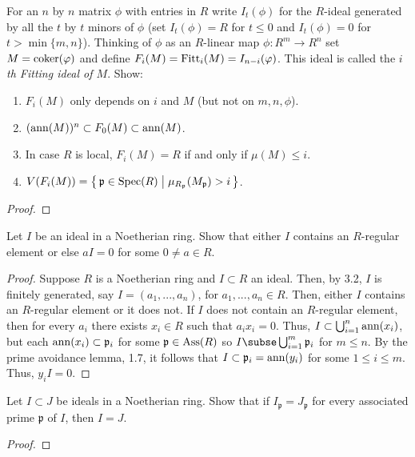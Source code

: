 \begin{problem}
For an $n$ by $n$ matrix $\phi$ with entries in $R$ write
$I_t(\phi)$ for the $R$-ideal generated by all the $t$ by $t$
minors of $\phi$ (set $I_t(\phi)=R$ for $t\leq 0$ and
$I_t(\phi)=0$ for $t>\min\{m,n\}$). Thinking of $\phi$ as an
$R$-linear map $\phi\colon R^m\to R^n$ set $M=\operatorname{coker}(\varphi)$ and
define $F_i(M)=\operatorname{Fitt}_i(M)=I_{n-i}(\varphi)$. This ideal is called
the \emph{$i$th Fitting ideal of $M$}. Show:
\begin{enumerate}[label=(\alph*)]
\item $F_i(M)$ only depends on $i$ and $M$ (but not on
  $m,n,\phi$).
\item $(\operatorname{ann}(M))^n\subset F_0(M)\subset\operatorname{ann}(M)$.
\item In case $R$ is local, $F_i(M)=R$ if and only if $\mu(M)\leq
  i$.
\item
  $V(F_i(M))=
\left\{\,\mathfrak{p}\in\operatorname{Spec}(R)\;\middle|\;\mu_{R_{\mathfrak{p}}}(M_{\mathfrak{p}})>i\,\right\}$.
\end{enumerate}
\end{problem}
\begin{proof}
\end{proof}
\newpage
\begin{problem}
Let $I$ be an ideal in a Noetherian ring. Show that either $I$
contains an $R$-regular element or else $aI=0$ for some $0\neq
a\in R$.
\end{problem}
\begin{proof}
Suppose $R$ is a Noetherian ring and $I\subset R$ an ideal. Then, by
3.2, $I$ is finitely generated, say $I=(a_1,...,a_n)$, for
$a_1,...,a_n\in R$. Then, either $I$ contains an $R$-regular element
or it does not. If $I$ does not contain an $R$-regular element, then
for every $a_i$ there exists $x_i\in R$ such that $a_ix_i=0$. Thus,
$I\subset\bigcup_{i=1}^n\operatorname{ann}(x_i)$, but each
$\operatorname{ann}(x_i)\subset\mathfrak{p}_i$ for some $\mathfrak{p}\in\operatorname{Ass}(R)$ so
$I\subse\bigcup_{i=1}^m\mathfrak{p}_i$ for $m\leq n$. By the prime
avoidance lemma, 1.7, it follows that
$I\subset\mathfrak{p}_i=\operatorname{ann}(y_i)$ for some $1\leq i\leq m$. Thus,
$y_iI=0$.
\end{proof}
\newpage
\begin{problem}
Let $I\subset J$ be ideals in a Noetherian ring. Show that if
$I_{\mathfrak{p}}=J_{\mathfrak{p}}$ for every associated prime
$\mathfrak{p}$ of $I$, then $I=J$.
\end{problem}
\begin{proof}

\end{proof}
